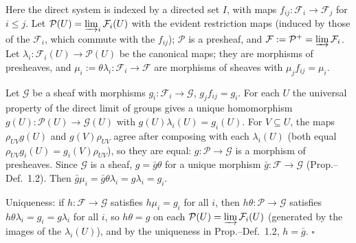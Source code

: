 \documentclass[11pt]{article}
\begin{document}
\pf
Here the direct system is indexed by a directed set $I$, with maps $f_{ij}\colon\mathcal F_i\to\mathcal F_j$ for $i\le j$. Let $\mathcal P(U)=\varinjlim_i\mathcal F_i(U)$ with the evident restriction maps (induced by those of the $\mathcal F_i$, which commute with the $f_{ij}$); $\mathcal P$ is a presheaf, and $\mathcal F:=\mathcal P^+=\varinjlim\mathcal F_i$. Let $\lambda_i\colon\mathcal F_i(U)\to\mathcal P(U)$ be the canonical maps; they are morphisms of presheaves, and $\mu_i:=\theta\lambda_i\colon\mathcal F_i\to\mathcal F$ are morphisms of sheaves with $\mu_j f_{ij}=\mu_i$.

Let $\mathcal G$ be a sheaf with morphisms $g_i\colon\mathcal F_i\to\mathcal G$, $g_jf_{ij}=g_i$. For each $U$ the universal property of the direct limit of groups gives a unique homomorphism $g(U)\colon\mathcal P(U)\to\mathcal G(U)$ with $g(U)\lambda_i(U)=g_i(U)$. For $V\subseteq U$, the maps $\rho_{UV}g(U)$ and $g(V)\rho_{UV}$ agree after composing with each $\lambda_i(U)$ (both equal $\rho_{UV}g_i(U)=g_i(V)\rho_{UV}$), so they are equal: $g\colon\mathcal P\to\mathcal G$ is a morphism of presheaves. Since $\mathcal G$ is a sheaf, $g=\bar g\theta$ for a unique morphism $\bar g\colon\mathcal F\to\mathcal G$ (Prop.--Def.~1.2). Then $\bar g\mu_i=\bar g\theta\lambda_i=g\lambda_i=g_i$.

Uniqueness: if $h\colon\mathcal F\to\mathcal G$ satisfies $h\mu_i=g_i$ for all $i$, then $h\theta\colon\mathcal P\to\mathcal G$ satisfies $h\theta\lambda_i=g_i=g\lambda_i$ for all $i$, so $h\theta=g$ on each $\mathcal P(U)=\varinjlim\mathcal F_i(U)$ (generated by the images of the $\lambda_i(U)$), and by the uniqueness in Prop.--Def.~1.2, $h=\bar g$. \hfill$\square$
\end{document}
